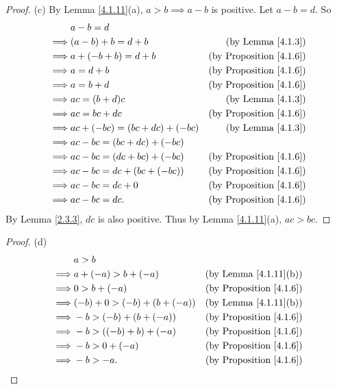 \begin{proof}{(c)}
By Lemma \ref{4.1.11}(a), \(a > b \implies a - b\) is positive.
Let \(a - b = d\).
So
\begin{align*}
& a - b = d \\
\implies & (a - b) + b = d + b & \text{(by Lemma \ref{4.1.3})} \\
\implies & a + (-b + b) = d + b & \text{(by Proposition \ref{4.1.6})} \\
\implies & a = d + b & \text{(by Proposition \ref{4.1.6})} \\
\implies & a = b + d & \text{(by Proposition \ref{4.1.6})} \\
\implies & ac = (b + d)c & \text{(by Lemma \ref{4.1.3})} \\
\implies & ac = bc + dc & \text{(by Proposition \ref{4.1.6})} \\
\implies & ac + (-bc) = (bc + dc) + (-bc) & \text{(by Lemma \ref{4.1.3})} \\
\implies & ac - bc = (bc + dc) + (-bc) \\
\implies & ac - bc = (dc + bc) + (-bc) & \text{(by Proposition \ref{4.1.6})} \\
\implies & ac - bc = dc + (bc + (-bc)) & \text{(by Proposition \ref{4.1.6})} \\
\implies & ac - bc = dc + 0 & \text{(by Proposition \ref{4.1.6})} \\
\implies & ac - bc = dc. & \text{(by Proposition \ref{4.1.6})}
\end{align*}
By Lemma \ref{2.3.3}, \(dc\) is also positive.
Thus by Lemma \ref{4.1.11}(a), \(ac > bc\).
\end{proof}

\begin{proof}{(d)}
\begin{align*}
& a > b \\
\implies & a + (-a) > b + (-a) & \text{(by Lemma \ref{4.1.11}(b))} \\
\implies & 0 > b + (-a) & \text{(by Proposition \ref{4.1.6})} \\
\implies & (-b) + 0 > (-b) + (b + (-a)) & \text{(by Lemma \ref{4.1.11}(b))} \\
\implies & -b > (-b) + (b + (-a)) & \text{(by Proposition \ref{4.1.6})} \\
\implies & -b > ((-b) + b) + (-a) & \text{(by Proposition \ref{4.1.6})} \\
\implies & -b > 0 + (-a) & \text{(by Proposition \ref{4.1.6})} \\
\implies & -b > -a. & \text{(by Proposition \ref{4.1.6})} \\
\end{align*}
\end{proof}

